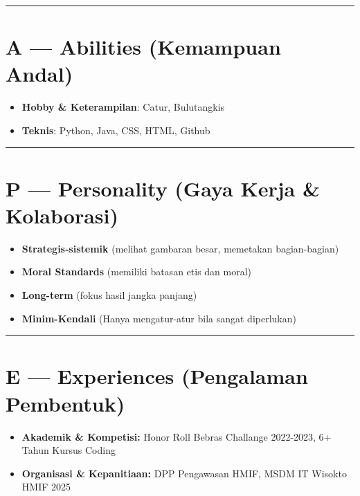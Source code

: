 \documentclass[
  letterpaper,
  DIV=11,
  numbers=noendperiod]{scrreprt}
\providecommand{\tightlist}{%
  \setlength{\itemsep}{0pt}\setlength{\parskip}{0pt}}
\begin{document}
\begin{center}\rule{0.5\linewidth}{0.5pt}\end{center}

\section{A --- Abilities (Kemampuan
Andal)}\label{a-abilities-kemampuan-andal}

\begin{itemize}
\tightlist
\item
  \textbf{Hobby \& Keterampilan}: Catur, Bulutangkis
\item
  \textbf{Teknis}: Python, Java, CSS, HTML, Github
\end{itemize}

\begin{center}\rule{0.5\linewidth}{0.5pt}\end{center}

\section{P --- Personality (Gaya Kerja \&
Kolaborasi)}\label{p-personality-gaya-kerja-kolaborasi}

\begin{itemize}
\tightlist
\item
  \textbf{Strategis‑sistemik} (melihat gambaran besar, memetakan
  bagian-bagian)
\item
  \textbf{Moral Standards} (memiliki batasan etis dan moral)
\item
  \textbf{Long-term} (fokus hasil jangka panjang)
\item
  \textbf{Minim-Kendali} (Hanya mengatur-atur bila sangat diperlukan)
\end{itemize}

\begin{center}\rule{0.5\linewidth}{0.5pt}\end{center}

\section{E --- Experiences (Pengalaman
Pembentuk)}\label{e-experiences-pengalaman-pembentuk}

\begin{itemize}
\tightlist
\item
  \textbf{Akademik \& Kompetisi:} Honor Roll Bebras Challange 2022-2023,
  6+ Tahun Kursus Coding
\item
  \textbf{Organisasi \& Kepanitiaan:} DPP Pengawasan HMIF, MSDM IT
  Wisokto HMIF 2025
\end{itemize}
\end{document}
